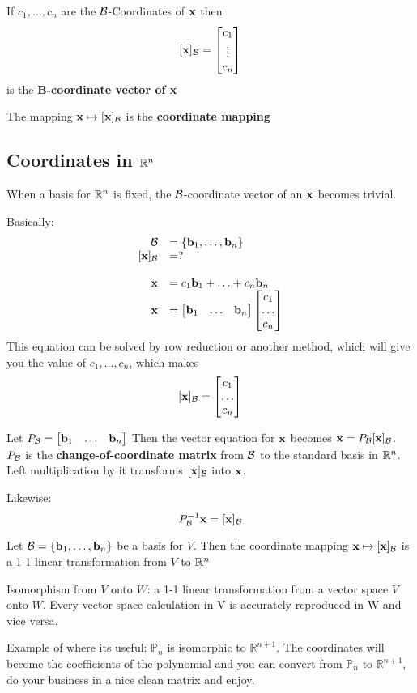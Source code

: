 \documentclass{report}
\begin{document}
If $c_1, \ldots, c_n$ are the $\mathcal{B}$-Coordinates of $\mathbf{x}$ then \[
[\mathbf{x}]_{\mathcal{B}} = \begin{bmatrix}
    c_1 \\ \vdots \\ c_n
\end{bmatrix}
\]
is the \textbf{B-coordinate vector of x}

The mapping $\mathbf{x} \mapsto [\mathbf{x}]_{\mathcal{B}}$ is the \textbf{coordinate mapping}

\subsection{Coordinates in $\mathbb{R}^n$}
When a basis for $\mathbb{R}^n$ is fixed, the $\mathcal{B}$-coordinate vector of an $\mathbf{x}$ becomes trivial.

Basically:
\[
\begin{array}{rlr}
    \BB &= \{\bb_1, \ldots, \bb_n\} \\
    \cB &= ?
    \\\\
    \xx &= c_1 \bb_1 + \ldots + c_n \bb_n \\ 
    \xx &= \begin{bmatrix}
        \bb_1 & \ldots & \bb_n
    \end{bmatrix} 
    \begin{bmatrix}
        c_1 \\ \ldots \\ c_n
    \end{bmatrix}
\end{array}
\]
This equation can be solved by row reduction or another method, 
which will give you the value of $c_1, \ldots, c_n$, which makes \[
    [\mathbf{x}]_{\mathcal{B}} = \begin{bmatrix}
        c_1 \\ \ldots \\ c_n
    \end{bmatrix}
\]

Let $P_{\mathcal{B}} = \begin{bmatrix}
    \mathbf{b}_1 & \ldots & \mathbf{b}_n
\end{bmatrix} $
Then the vector equation for $\mathbf{x}$ becomes $\mathbf{x} = P_{\mathcal{B}} [\mathbf{x}]_{\mathcal{B}}$.
$P_{\mathcal{B}}$ is the \textbf{change-of-coordinate matrix} from $\mathcal{B}$ to the standard basis in $\mathbb{R}^n$. Left
multiplication by it transforms $[\mathbf{x}]_{\mathcal{B}}$ into $\mathbf{x}$.


Likewise:\[
P_{\mathcal{B}}^{-1} \mathbf{x} = [\mathbf{x}]_{\mathcal{B}}
\]

\begin{theorem}
    Let $\mathcal{B} = \{\mathbf{b}_1, \ldots, \mathbf{b}_n\}$ be a basis for $V$. Then the coordinate 
    mapping $\mathbf{x} \mapsto [\mathbf{x}]_{\mathcal{B}}$ is a 1-1 linear transformation from $V$ to $\mathbb{R}^n$
\end{theorem}

\begin{definition}
    Isomorphism from $V$ onto $W$: a 1-1 linear transformation from a vector space
    $V$ onto $W$. Every vector space calculation in V is accurately reproduced in W
    and vice versa.
\end{definition}
Example of where its useful: $\mathbb{P}_n$ is isomorphic to $\mathbb{R}^{n+1}$.
The coordinates will become the coefficients of the polynomial and you can 
convert from $\mathbb{P}_n$ to $\mathbb{R}^{n+1}$, do your business in a nice
clean matrix and enjoy.
\end{document}
